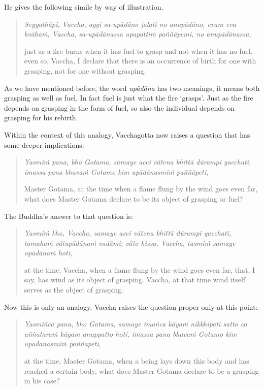 He gives the following simile by way of illustration.

\begin{quote}
\emph{Seyyathāpi, Vaccha, aggi sa-upādāno jalati no anupādāno, evam eva kvāhaṁ, Vaccha, sa-upādānassa upapattiṁ paññāpemi, no anupādānassa},

just as a fire burns when it has fuel to grasp and not when it has no fuel, even so, Vaccha, I declare that there is an occurrence of birth for one with grasping, not for one without grasping.
\end{quote}

As we have mentioned before, the word \emph{upādāna} has two meanings, it means both grasping as well as fuel. In fact fuel is just what the fire `grasps'. Just as the fire depends on grasping in the form of fuel, so also the individual depends on grasping for his rebirth.

Within the context of this analogy, Vacchagotta now raises a question that has some deeper implications:

\begin{quote}
\emph{Yasmiṁ pana, bho Gotama, samaye acci vātena khittā dūrampi gacchati, imassa pana bhavaṁ Gotamo kim upādānasmiṁ paññāpeti},

Master Gotama, at the time when a flame flung by the wind goes even far, what does Master Gotama declare to be its object of grasping or fuel?
\end{quote}

The Buddha's answer to that question is:

\begin{quote}
\emph{Yasmiṁ kho, Vaccha, samaye acci vātena khittā dūrampi gacchati, tamahaṁ vātupādānaṁ vadāmi; vāto hissa, Vaccha, tasmiṁ samaye upādānaṁ hoti},

at the time, Vaccha, when a flame flung by the wind goes even far, that, I say, has wind as its object of grasping. Vaccha, at that time wind itself serves as the object of grasping.
\end{quote}

Now this is only an analogy. Vaccha raises the question proper only at this point:

\begin{quote}
\emph{Yasmiñca pana, bho Gotama, samaye imañca kāyaṁ nikkhipati satto ca aññataraṁ kāyam anuppatto hoti, imassa pana bhavaṁ Gotamo kim upādānasmiṁ paññāpeti},

at the time, Master Gotama, when a being lays down this body and has reached a certain body, what does Master Gotama declare to be a grasping in his case?
\end{quote}

